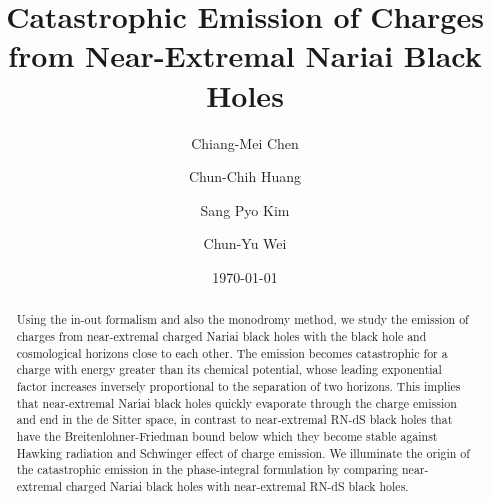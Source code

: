 \documentclass[aps,nofootinbib,superscriptaddress
]{revtex4}
\begin{document}
\title{Catastrophic Emission of Charges from Near-Extremal Nariai Black Holes}

\author{Chiang-Mei Chen} 

\author{Chun-Chih Huang} 

\author{Sang Pyo Kim} 

\author{Chun-Yu Wei} 


\date{\today}

\begin{abstract}
Using the in-out formalism and also the monodromy method, we study the emission of charges from near-extremal charged Nariai black holes with the black hole and cosmological horizons close to each other. The emission becomes catastrophic for a charge with energy greater than its chemical potential, whose leading exponential factor increases inversely proportional to the separation of two horizons. This implies that near-extremal Nariai black holes quickly evaporate through the charge emission and end in the de Sitter space, in contrast to near-extremal RN-dS black holes that have the Breitenlohner-Friedman bound below which they become stable against Hawking radiation and Schwinger effect of charge emission. We illuminate the origin of the catastrophic emission in the phase-integral formulation by comparing near-extremal charged Nariai black holes with near-extremal RN-dS black holes.
\end{abstract}


\maketitle

\end{document}
